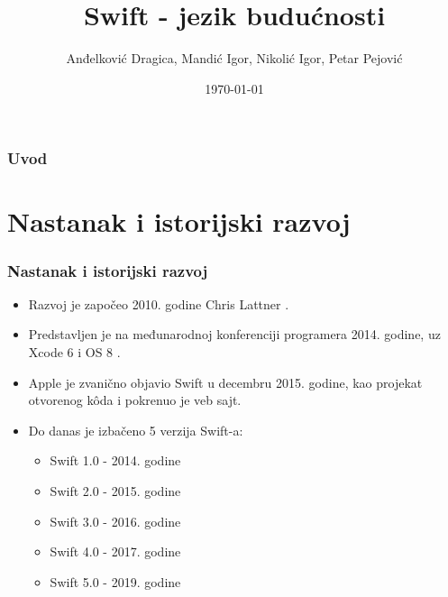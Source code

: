 \documentclass{beamer}
\title[Swift]{Swift - jezik budućnosti} %
\author[AD, PP, IM, IN]{Anđelković Dragica, Mandić Igor, Nikolić Igor, Petar Pejović} %
\institute[Matf] %
{
Matematički fakultet \\ %
\medskip
\textit{andjelkovic.dragica96@gmail.com, igormandic996@gmail.com, \\ igor.nikolic032@hotmail.com, petar.pejovic8@gmail.com} %
}
\date{\today} %
\begin{document}
\begin{frame}
\titlepage %
\end{frame}

\begin{frame}
\frametitle{Uvod} %
\tableofcontents %





\end{frame}
\section{Nastanak i istorijski razvoj}
\begin{frame}
\frametitle{Nastanak i istorijski razvoj}
\begin{itemize}
\item  Razvoj je započeo 2010. godine Chris Lattner \cite{mastering_swift3}.
\item  Predstavljen je na međunarodnoj konferenciji programera 2014. godine, uz  Xcode 6 i OS 8 \cite{thenextweb_sajt}.
\item Apple je zvanično objavio Swift u decembru 2015. godine, kao projekat otvorenog k\^{o}da i pokrenuo je veb sajt.
\item Do danas je izbačeno 5 verzija Swift-a:
\begin{itemize}
\item{Swift 1.0} - 2014. godine
\item{Swift 2.0} - 2015. godine
\item{Swift 3.0} - 2016. godine
\item{Swift 4.0} - 2017. godine
\item{Swift 5.0} - 2019. godine
\end{itemize}
\end{itemize}

\end{frame}
\end{document}
